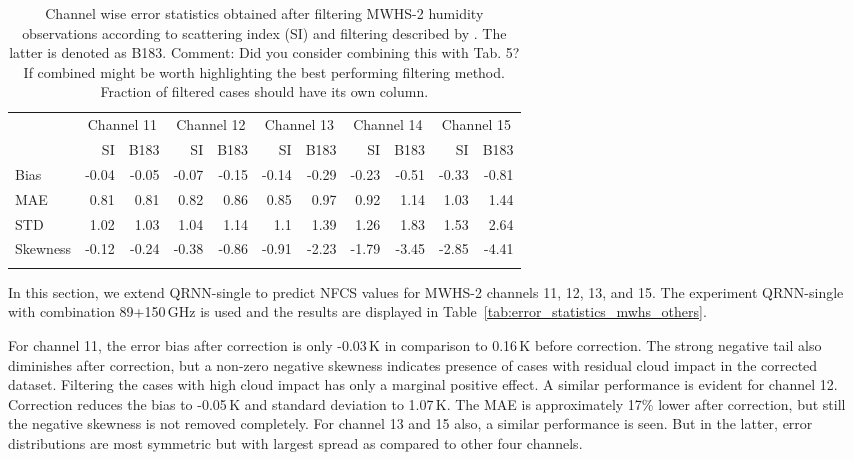 \documentclass[amt, manuscript]{copernicus}
\newcommand{\todo}[1]{{\color{red} #1}}
\begin{document}
\begin{table}[t]
	\caption{Channel wise error statistics obtained after filtering MWHS-2 humidity observations  according to scattering index (SI) and filtering described by \citet{buehler:aclou:07}. The latter is denoted as  B183. \todo{Comment: Did you consider combining this with Tab. 5? If combined might be worth highlighting the best performing filtering method. Fraction of filtered cases should have its own column.}}
	\label{tab:SI_statistics}
	\begin{tabular}{lrr|rr|rr|rr|rr}
		\tophline
		& \multicolumn{2}{c|}{Channel 11} & \multicolumn{2}{c|}{Channel 12} & \multicolumn{2}{c|}{Channel 13} & \multicolumn{2}{c|}{Channel 14} & \multicolumn{2}{c}{Channel 15}\\
			& SI & B183 & SI & B183 & SI & B183 & SI & B183 & SI & B183\\
			\cline{2-11}
		Bias 	 &-0.04	& -0.05	& -0.07 &  -0.15 &  -0.14 & -0.29	&-0.23 &  -0.51 & -0.33 &  -0.81\\
		MAE  	 & 0.81	&  0.81	&  0.82 &	0.86 &	 0.85 &  0.97   & 0.92 &   1.14 &  1.03 &	1.44\\
		STD  	 &1.02	&  1.03	&  1.04 &	1.14 &	 1.1  &  1.39	& 1.26 &   1.83 &  1.53 &	2.64\\
		Skewness &-0.12 & -0.24 & -0.38 & -0.86  &  -0.91 & -2.23   &-1.79 &  -3.45 & -2.85 &  -4.41\\
		\bottomhline		
	\end{tabular}
\end{table}

In this section, we extend QRNN-single to predict NFCS values for MWHS-2 channels 11, 12, 13, and 15. The experiment QRNN-single with combination 89+150\,GHz is used and the results are displayed in Table~\ref{tab:error_statistics_mwhs_others}.

For channel 11, the error bias after correction is only -0.03\,K in comparison to 0.16\,K before correction. The strong negative tail also diminishes after correction, but a non-zero negative skewness indicates presence of cases with residual cloud impact in the corrected dataset. Filtering the cases with high cloud impact has only a marginal positive effect. A similar performance is evident for channel 12. Correction reduces the bias to -0.05\,K and standard deviation to 1.07\,K. The MAE is approximately 17\% lower after correction, but still the negative skewness is not removed completely. For channel 13 and 15 also, a similar performance is seen. But in the latter, error distributions are most symmetric but with largest spread as compared to other four channels.
\end{document}
